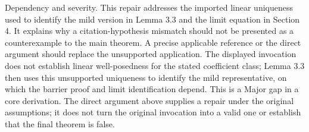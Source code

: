 \documentclass[10pt]{article}
\begin{document}
Dependency and severity. This repair addresses the imported linear uniqueness used to identify the mild version in Lemma 3.3 and the limit equation in Section 4. It explains why a citation-hypothesis mismatch should not be presented as a counterexample to the main theorem. A precise applicable reference or the direct argument should replace the unsupported application. The displayed invocation does not establish linear well-posedness for the stated coefficient class; Lemma 3.3 then uses this unsupported uniqueness to identify the mild representative, on which the barrier proof and limit identification depend. This is a Major gap in a core derivation. The direct argument above supplies a repair under the original assumptions; it does not turn the original invocation into a valid one or establish that the final theorem is false.\par
\end{document}
